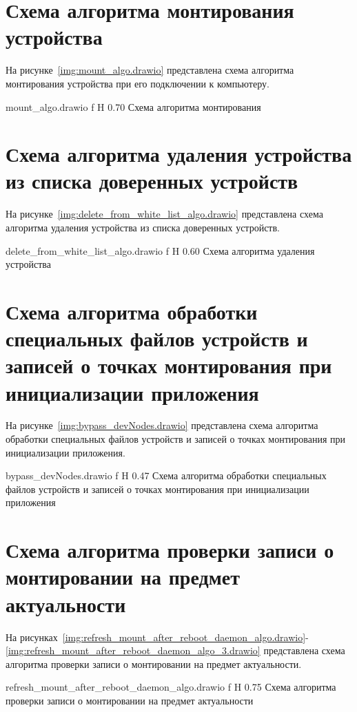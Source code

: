 \section{Схема алгоритма монтирования устройства}

На рисунке~\ref{img:mount_algo.drawio} представлена схема алгоритма монтирования устройства
при его подключении к компьютеру.

    {mount_algo.drawio}
    {f}
    {H}
    {0.70\textwidth}
    {Схема алгоритма монтирования}

\section{Схема алгоритма удаления устройства из списка доверенных устройств}

На рисунке~\ref{img:delete_from_white_list_algo.drawio} представлена схема алгоритма 
удаления устройства из списка доверенных устройств.

    {delete_from_white_list_algo.drawio}
    {f}
    {H}
    {0.60\textwidth}
    {Схема алгоритма удаления устройства}

\section{Схема алгоритма обработки специальных файлов устройств и записей о точках монтирования при инициализации приложения}

На рисунке~\ref{img:bypass_devNodes.drawio} представлена схема алгоритма 
обработки специальных файлов устройств и записей о точках монтирования при инициализации приложения.

    {bypass_devNodes.drawio}
    {f}
    {H}
    {0.47\textwidth}
    {Схема алгоритма обработки специальных файлов устройств и записей о точках монтирования при инициализации приложения}

\section{Схема алгоритма проверки записи о монтировании на предмет актуальности}

На рисунках~\ref{img:refresh_mount_after_reboot_daemon_algo.drawio}-\ref{img:refresh_mount_after_reboot_daemon_algo_3.drawio} представлена схема алгоритма 
проверки записи о монтировании на предмет актуальности.

    {refresh_mount_after_reboot_daemon_algo.drawio}
    {f}
    {H}
    {0.75\textwidth}
    {Схема алгоритма проверки записи о монтировании на предмет актуальности}


